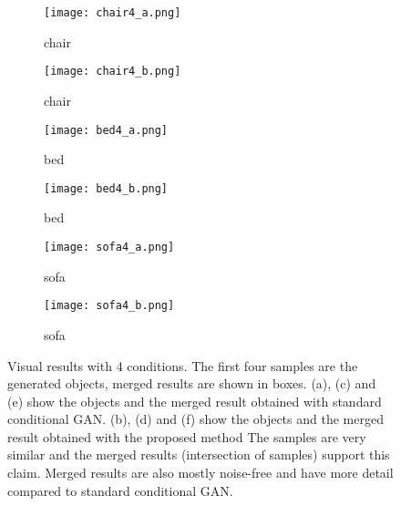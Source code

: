 \documentclass[runningheads]{llncs}
\begin{document}
\begin{figure}

\centering
\begin{subfigure}{.45\textwidth}
  \centering
  \texttt{[image: chair4\_a.png]}
  \caption{chair}
 \label{fig:sfig5a}
\end{subfigure}%
\qquad
\begin{subfigure}{.4\textwidth}
  \centering
  \texttt{[image: chair4\_b.png]}
  \caption{chair}
  \label{fig:sfig5b}
\end{subfigure}

\begin{subfigure}{.45\textwidth}
  \centering
  \texttt{[image: bed4\_a.png]}
  \caption{bed}
 \label{fig:sfig5c}
\end{subfigure}%
\qquad
\begin{subfigure}{.4\textwidth}
  \centering
  \texttt{[image: bed4\_b.png]}
  \caption{bed}
  \label{fig:sfig5d}
\end{subfigure}

\begin{subfigure}{.45\textwidth}
  \centering
  \texttt{[image: sofa4\_a.png]}
  \caption{sofa}
 \label{fig:sfig5e}
\end{subfigure}%
\qquad
\begin{subfigure}{.4\textwidth}
  \centering
  \texttt{[image: sofa4\_b.png]}
  \caption{sofa}
  \label{fig:sfig5f}
\end{subfigure}
\caption{Visual results with 4 conditions. The first four samples are the generated objects, merged results are shown in boxes. (a), (c) and (e) show the objects and the merged result obtained with standard conditional GAN. (b), (d) and (f) show the objects and the merged result obtained with the proposed method The samples are very similar and the merged results (intersection of samples) support this claim. Merged results are also mostly noise-free and have more detail compared to standard conditional GAN.}
\label{fig:fig5}
\end{figure}
\end{document}
